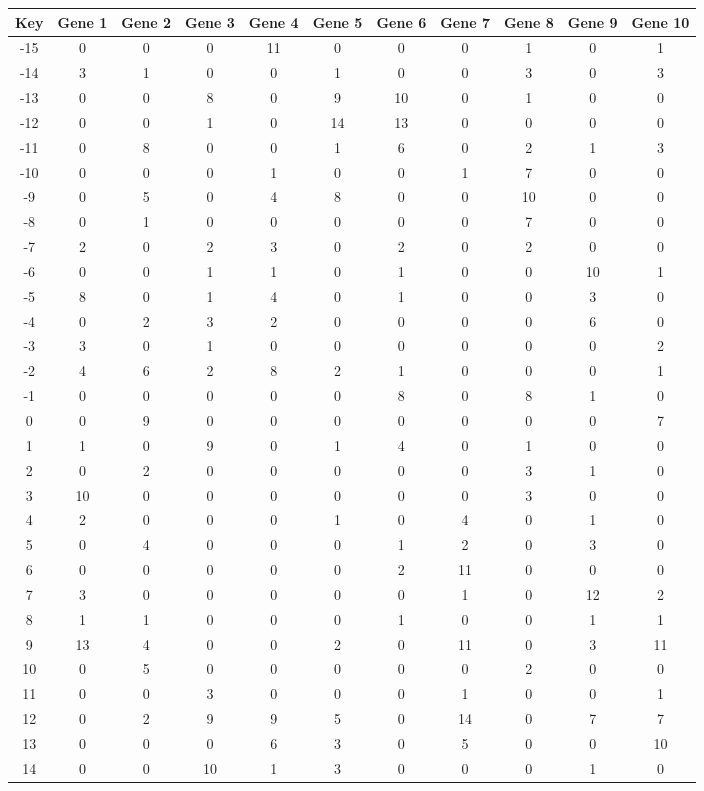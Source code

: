 \begin{tabular}{|c|c|c|c|c|c|c|c|c|c|c|}
\hline
Key & Gene 1 & Gene 2 & Gene 3 & Gene 4 & Gene 5 & Gene 6 & Gene 7 & Gene 8 & Gene 9 & Gene 10 \\
\hline
-15 & 0 & 0 & 0 & 11 & 0 & 0 & 0 & 1 & 0 & 1 \\
-14 & 3 & 1 & 0 & 0 & 1 & 0 & 0 & 3 & 0 & 3 \\
-13 & 0 & 0 & 8 & 0 & 9 & 10 & 0 & 1 & 0 & 0 \\
-12 & 0 & 0 & 1 & 0 & 14 & 13 & 0 & 0 & 0 & 0 \\
-11 & 0 & 8 & 0 & 0 & 1 & 6 & 0 & 2 & 1 & 3 \\
-10 & 0 & 0 & 0 & 1 & 0 & 0 & 1 & 7 & 0 & 0 \\
-9 & 0 & 5 & 0 & 4 & 8 & 0 & 0 & 10 & 0 & 0 \\
-8 & 0 & 1 & 0 & 0 & 0 & 0 & 0 & 7 & 0 & 0 \\
-7 & 2 & 0 & 2 & 3 & 0 & 2 & 0 & 2 & 0 & 0 \\
-6 & 0 & 0 & 1 & 1 & 0 & 1 & 0 & 0 & 10 & 1 \\
-5 & 8 & 0 & 1 & 4 & 0 & 1 & 0 & 0 & 3 & 0 \\
-4 & 0 & 2 & 3 & 2 & 0 & 0 & 0 & 0 & 6 & 0 \\
-3 & 3 & 0 & 1 & 0 & 0 & 0 & 0 & 0 & 0 & 2 \\
-2 & 4 & 6 & 2 & 8 & 2 & 1 & 0 & 0 & 0 & 1 \\
-1 & 0 & 0 & 0 & 0 & 0 & 8 & 0 & 8 & 1 & 0 \\
0 & 0 & 9 & 0 & 0 & 0 & 0 & 0 & 0 & 0 & 7 \\
1 & 1 & 0 & 9 & 0 & 1 & 4 & 0 & 1 & 0 & 0 \\
2 & 0 & 2 & 0 & 0 & 0 & 0 & 0 & 3 & 1 & 0 \\
3 & 10 & 0 & 0 & 0 & 0 & 0 & 0 & 3 & 0 & 0 \\
4 & 2 & 0 & 0 & 0 & 1 & 0 & 4 & 0 & 1 & 0 \\
5 & 0 & 4 & 0 & 0 & 0 & 1 & 2 & 0 & 3 & 0 \\
6 & 0 & 0 & 0 & 0 & 0 & 2 & 11 & 0 & 0 & 0 \\
7 & 3 & 0 & 0 & 0 & 0 & 0 & 1 & 0 & 12 & 2 \\
8 & 1 & 1 & 0 & 0 & 0 & 1 & 0 & 0 & 1 & 1 \\
9 & 13 & 4 & 0 & 0 & 2 & 0 & 11 & 0 & 3 & 11 \\
10 & 0 & 5 & 0 & 0 & 0 & 0 & 0 & 2 & 0 & 0 \\
11 & 0 & 0 & 3 & 0 & 0 & 0 & 1 & 0 & 0 & 1 \\
12 & 0 & 2 & 9 & 9 & 5 & 0 & 14 & 0 & 7 & 7 \\
13 & 0 & 0 & 0 & 6 & 3 & 0 & 5 & 0 & 0 & 10 \\
14 & 0 & 0 & 10 & 1 & 3 & 0 & 0 & 0 & 1 & 0 \\
\hline
\end{tabular}